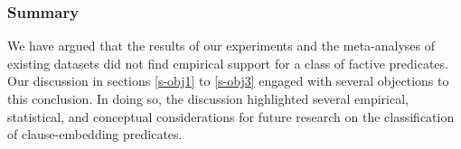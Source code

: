 \documentclass{language}
\newcommand{\6}{\mbox{$[\hspace*{-.6mm}[$}}
\newcommand{\9}{\mbox{$]\hspace*{-.6mm}]$}}
\begin{document}
%


\subsubsection{Summary}

We have argued that the results of our experiments and the meta-analyses of existing datasets did not find empirical support for a class of factive predicates. Our discussion in sections \ref{s-obj1} to \ref{s-obj3} engaged with several objections to this conclusion. In doing so, the discussion highlighted several empirical, statistical, and conceptual considerations for future research on the classification of clause-embedding predicates.

\end{document}
